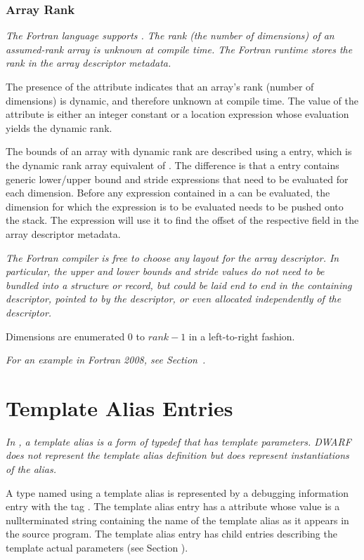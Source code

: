 \subsubsection{Array Rank}
\label{chap:DWATrank}
\textit{The Fortran language supports . The
  rank (the number of dimensions) of an assumed-rank array is unknown
  at compile time. The Fortran runtime stores the rank in the array
  descriptor metadata.}

The presence of the
\hypertarget{chap:DWATrankofdynamicarray}{\DWATrankINDX}
attribute indicates that an array's rank
(number of dimensions) is dynamic, and therefore unknown at compile
time. The value of the \DWATrankINDX{} attribute is either an integer constant
or a location expression whose evaluation yields the dynamic rank.

The bounds of an array with dynamic rank are described using a
\DWTAGgenericsubrange{} entry, which  
is the dynamic rank array equivalent of
\DWTAGsubrangetype. The
difference is that a \DWTAGgenericsubrange{} entry contains generic
lower/upper bound and stride expressions that need to be evaluated for
each dimension. Before any expression contained in a
\DWTAGgenericsubrange{} can be evaluated, the dimension for which the
expression is to be evaluated needs to be pushed onto the stack. The
expression will use it to find the offset of the respective field in
the array descriptor metadata.

\textit{The Fortran compiler is free to choose any layout for the
  array descriptor. In particular, the upper and lower bounds and
  stride values do not need to be bundled into a structure or record,
  but could be laid end to end in the containing descriptor, pointed
  to by the descriptor, or even allocated independently of the
  descriptor.}

Dimensions are enumerated $0$ to $\mathit{rank}-1$ in a left-to-right
fashion.

\textit{For an example in Fortran 2008, see
  Section~.}

\section{Template Alias Entries}
\label{chap:templatealiasentries}

\textit{
In , a template alias is a form of typedef that has template
parameters.  DWARF does not represent the template alias definition
but does represent instantiations of the alias.
}

A type named using a template alias is represented
by a debugging information entry 
with the tag
\DWTAGtemplatealiasTARG. 
The template alias entry has a
\DWATname{} attribute 
whose value is a null\dash terminated string
containing the name of the template alias as it appears in
the source program.
The template alias entry has child entries describing the template
actual parameters (see Section ).

